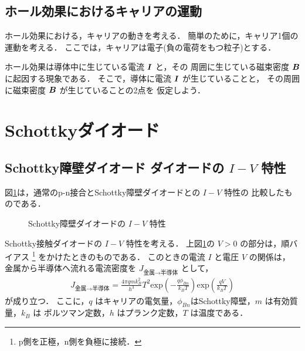         \subsection{ホール効果におけるキャリアの運動}
             ホール効果における，キャリアの動きを考える．
             簡単のために，キャリア1個の運動を考える．
             ここでは，キャリアは電子(負の電荷をもつ粒子)とする．

             ホール効果は導体中に生じている電流 $\boldsymbol{I}$ と，その
             周囲に生じている磁束密度 $\boldsymbol{B}$ に起因する現象である．
             そこで，導体に電流 $\boldsymbol{I}$ が生じていることと，
             その周囲に磁束密度 $\boldsymbol{B}$ が生じていることの2点を
             仮定しよう．

    \section{Schottkyダイオード}
        \subsection{Schottky障壁ダイオード ダイオードの $I-V$ 特性}
        図\ref{fig:Schottky}は，通常のp-n接合とSchottky障壁ダイオードとの $I-V$ 特性の
        比較したものである．
                        \begin{figure}[htbp]
                            \begin{center}
                                \caption{Schottky障壁ダイオードの $I-V$ 特性}
                                \label{fig:Schottky}
                            \end{center}
                        \end{figure}

        Schottky接触ダイオードの $I-V$ 特性を考える．
        上図\ref{fig:Schottky}の $V>0$ の部分は，順バイアス
            \footnote{
                p側を正極，n側を負極に接続．
            }
        をかけたときのものである．
        このときの電流 $I$ と電圧 $V$ の関係は，
        金属から半導体へ流れる電流密度を $J_{\mbox{金属} \rightarrow \mbox{半導体}}$ として，
        \begin{align}\label{RD_1}
        J_{\mbox{金属} \rightarrow \mbox{半導体}}
        =\frac{4\pi qmk_{B}^{2}}{h^{3}}T^{2}
        \mathrm{exp}\left(-\frac{q\phi_{Bn}}{k_{B}T}\right)
        \mathrm{exp}\left(\frac{qV}{k_{B}T}\right)
        \end{align}
        が成り立つ．
        ここに，$q$ はキャリアの電気量，$\phi_{Bn}$はSchottky障壁，$m$ は有効質量，$k_{B}$ は
        ボルツマン定数，$h$ はプランク定数，$T$ は温度である．

